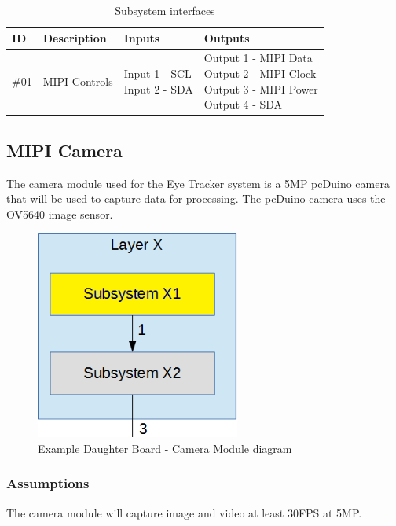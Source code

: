 \begin {table}[H]
\caption {Subsystem interfaces}
\begin{center}
    \begin{tabular}{ | p{1cm} | p{6cm} | p{3cm} | p{3cm} |}
    \hline
    ID & Description & Inputs & Outputs \\ \hline
     \#01 & MIPI Controls & \pbox{3cm}{Input 1 - SCL \\ Input 2 - SDA} & \pbox{3cm}{Output 1 - MIPI Data \\ Output 2 - MIPI Clock \\ Output 3 - MIPI Power \\ Output 4 - SDA}  \\ \hline
    \end{tabular}
\end{center}
\end{table}

\subsection{MIPI Camera}
The camera module used for the Eye Tracker system is a 5MP pcDuino camera that will be used to capture data for processing. The pcDuino camera uses the OV5640 image sensor.

\begin{figure}[h!]
	\centering
 	\includegraphics[width=0.60\textwidth]{images/subsystem}
 \caption{Example Daughter Board - Camera Module diagram}
\end{figure}

\subsubsection{Assumptions}
The camera module will capture image and video at least 30FPS at 5MP.

